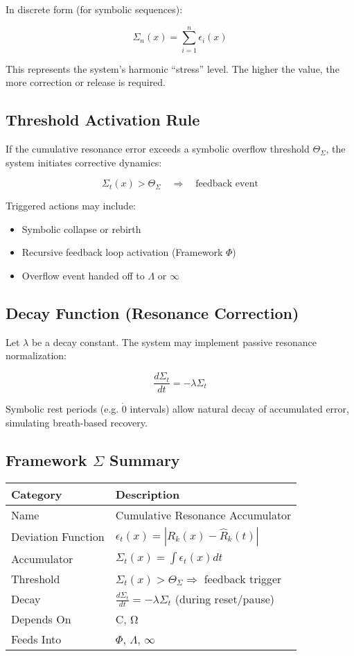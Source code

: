In discrete form (for symbolic sequences):

\[
\Sigma_n(x) = \sum_{i=1}^{n} \epsilon_i(x)
\]

This represents the system’s harmonic “stress” level. The higher the value, the more correction or release is required.

\subsection*{Threshold Activation Rule}

If the cumulative resonance error exceeds a symbolic overflow threshold $\Theta_\Sigma$, the system initiates corrective dynamics:

\[
\Sigma_t(x) > \Theta_\Sigma \quad \Rightarrow \quad \text{feedback event}
\]

Triggered actions may include:
\begin{itemize}
  \item Symbolic collapse or rebirth
  \item Recursive feedback loop activation (Framework $\Phi$)
  \item Overflow event handed off to $\Lambda$ or $\infty$
\end{itemize}

\subsection*{Decay Function (Resonance Correction)}

Let $\lambda$ be a decay constant. The system may implement passive resonance normalization:

\[
\frac{d\Sigma_t}{dt} = -\lambda \Sigma_t
\]

Symbolic rest periods (e.g. $\dot{0}$ intervals) allow natural decay of accumulated error, simulating breath-based recovery.

\subsection*{Framework $\Sigma$ Summary}

\begin{center}
\begin{tabular}{|l|l|}
\hline
\textbf{Category} & \textbf{Description} \\
\hline
Name & Cumulative Resonance Accumulator \\
Deviation Function & $\epsilon_t(x) = |R_k(x) - \hat{R}_k(t)|$ \\
Accumulator & $\Sigma_t(x) = \int \epsilon_t(x) dt$ \\
Threshold & $\Sigma_t(x) > \Theta_\Sigma \Rightarrow$ feedback trigger \\
Decay & $\frac{d\Sigma_t}{dt} = -\lambda \Sigma_t$ (during reset/pause) \\
Depends On & C, Ω \\
Feeds Into & $\Phi$, $\Lambda$, $\infty$ \\
\hline
\end{tabular}
\end{center}


